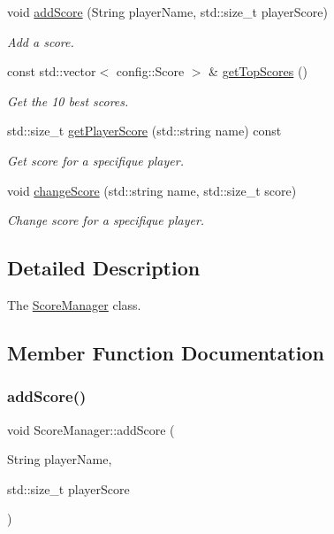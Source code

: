 \begin{DoxyCompactItemize}
void \hyperlink{classScoreManager_a0fbdc6d4274068a96817109e499d03f3}{add\+Score} (String player\+Name, std\+::size\+\_\+t player\+Score)
\begin{DoxyCompactList}\small\item\em Add a score. \end{DoxyCompactList}\item 
\mbox{\label{classScoreManager_ad0c38dd0a27a82230d09f29ce3d12349}} 
const std\+::vector$<$ config\+::\+Score $>$ \& \hyperlink{classScoreManager_ad0c38dd0a27a82230d09f29ce3d12349}{get\+Top\+Scores} ()
\begin{DoxyCompactList}\small\item\em Get the 10 best scores. \end{DoxyCompactList}\item 
std\+::size\+\_\+t \hyperlink{classScoreManager_abc6c1d76fdcc17f1b8ebe4c7bf5550e2}{get\+Player\+Score} (std\+::string name) const
\begin{DoxyCompactList}\small\item\em Get score for a specifique player. \end{DoxyCompactList}\item 
void \hyperlink{classScoreManager_a01a80dda216fa5b83b58bca8de49114e}{change\+Score} (std\+::string name, std\+::size\+\_\+t score)
\begin{DoxyCompactList}\small\item\em Change score for a specifique player. \end{DoxyCompactList}\end{DoxyCompactItemize}


\subsection{Detailed Description}
The \hyperlink{classScoreManager}{Score\+Manager} class. 

\subsection{Member Function Documentation}
\mbox{\label{classScoreManager_a0fbdc6d4274068a96817109e499d03f3}} 
\subsubsection{\texorpdfstring{add\+Score()}{addScore()}}
{\footnotesize\ttfamily void Score\+Manager\+::add\+Score (\begin{DoxyParamCaption}\item[{String}]{player\+Name,  }\item[{std\+::size\+\_\+t}]{player\+Score }\end{DoxyParamCaption})}



